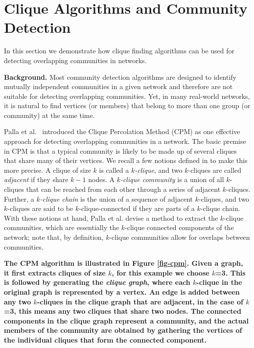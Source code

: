 \section{Clique Algorithms and Community Detection}
\label{sec:applications}

In this section we demonstrate how clique finding algorithms can be used for detecting overlapping communities in networks. 


{\bf Background. }
Most community detection algorithms are designed to identify mutually independent communities in a given network and therefore are not suitable for detecting overlapping communities. Yet, in many real-world networks, it is natural to find vertices (or members) that belong to more than one group (or community) at the same time.

Palla et al.~\cite{cite-key} introduced the Clique Percolation Method (CPM) 
as one effective approach for detecting overlapping communities in a network. 
The basic premise in CPM is that a typical community is likely to be made up of several cliques that share many of their vertices.  
We recall a few notions defined in \cite{cite-key} to make this more precise.
A clique of size $k$ is called a {\em $k$-clique}, and   
two $k$-cliques are called {\em adjacent} if they share $k - 1$ nodes. 
A {\em $k$-clique community} is a union of all $k$-cliques that can be reached 
from each other through a series of adjacent $k$-cliques. 
Further, a {\em $k$-clique chain} is the union of a sequence of adjacent $k$-cliques, and
two $k$-cliques are said to be $k$-clique-connected if they are parts of a $k$-clique chain. With these notions at hand, Palla et al. devise a method to extract the $k$-clique communities, which  are essentially the $k$-clique connected components of the network; 
note that, by definition, $k$-clique communities allow for
overlaps between communities.

{\bf The CPM algorithm is illustrated in Figure \ref{fig-cpm}. Given a graph, it first extracts cliques of size $k$, for this example we choose $k$=3. This is followed by generating the {\it clique graph}, where each $k$-clique in the original graph is represented by a vertex. An edge is added between any two $k$-cliques in the clique graph that are adjacent, in the case of $k$=3, this means any two cliques that share two nodes. The connected components in the clique graph represent a community, and the actual members of the community are obtained by gathering the vertices of the individual cliques that form the connected component. }


